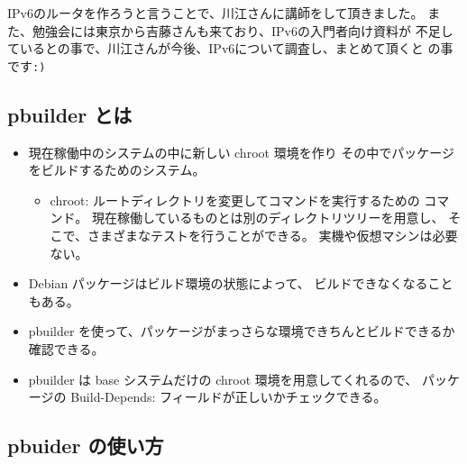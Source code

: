 \documentclass[mingoth,a4paper]{jsarticle}
\begin{document}
IPv6のルータを作ろうと言うことで、川江さんに講師をして頂きました。
また、勉強会には東京から吉藤さんも来ており、IPv6の入門者向け資料が
不足しているとの事で、川江さんが今後、IPv6について調査し、まとめて頂くと
の事です\verb|:)|


\subsection{pbuilder とは}

\begin{itemize}
\item 現在稼働中のシステムの中に新しい chroot 環境を作り
  その中でパッケージをビルドするためのシステム。
  \begin{itemize}
  \item chroot: ルートディレクトリを変更してコマンドを実行するための
    コマンド。
    現在稼働しているものとは別のディレクトリツリーを用意し、
    そこで、さまざまなテストを行うことができる。
    実機や仮想マシンは必要ない。
  \end{itemize}
\item Debian パッケージはビルド環境の状態によって、
  ビルドできなくなることもある。
\item pbuilder を使って、パッケージがまっさらな環境できちんとビルドできるか
  確認できる。
\item pbuilder は base システムだけの chroot 環境を用意してくれるので、
  パッケージの Build-Depends: フィールドが正しいかチェックできる。
\end{itemize}


\subsection{pbuider の使い方}
\end{document}
